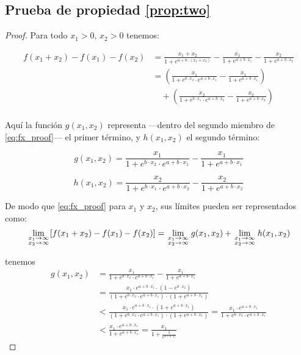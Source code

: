 \subsection{Prueba de propiedad \ref{prop:two}}
\begin{proof}
Para todo $x_1>0$, $x_2>0$ tenemos:

\begin{equation}
\label{eq:fx_proof}
\begin{aligned}
f(x_1+x_2)-f(x_1)-f(x_2)&=\frac{x_1+x_2}{1+e^{a+b\cdot (x_1+x_2)}}-\frac{x_1}{1+e^{a+b\cdot x_1}}-\frac{x_2}{1+e^{a+b\cdot x_2}}\\
&=(\frac{x_1}{1+e^{b\cdot x_2}\cdot e^{a+b\cdot {x_1}}}-\frac{x_1}{1+e^{a+b\cdot x_1}})\\
&\quad +(\frac{x_2}{1+e^{b\cdot x_1}\cdot e^{a+b\cdot {x_2}}}-\frac{x_2}{1+e^{a+b\cdot x_2}})\\
\end{aligned}
\end{equation}

Aquí la función $g(x_1,x_2)$ representa —dentro del segundo miembro de \ref{eq:fx_proof}— el primer término, y $h(x_1,x_2)$ el segundo término:

\begin{equation}
\label{eq:gx_func_proof}
g(x_1,x_2)=\frac{x_1}{1+e^{b\cdot x_2}\cdot e^{a+b\cdot {x_1}}}-\frac{x_1}{1+e^{a+b\cdot x_1}}
\end{equation}

\begin{equation}
\label{eq:hx_func_proof}
h(x_1,x_2)=\frac{x_2}{1+e^{b\cdot x_1}\cdot e^{a+b\cdot {x_2}}}-\frac{x_2}{1+e^{a+b\cdot x_2}}
\end{equation}

De modo que \eqref{eq:fx_proof} para $x_1$ y $x_2$, sus límites pueden ser representados como:
\[
\mathop {\lim }\limits_{\scriptstyle x_1 \to \infty  \hfill \atop  \scriptstyle x_2 \to \infty  \hfill}[f(x_1+x_2)-f(x_1)-f(x_2)]=\mathop {\lim }\limits_{\scriptstyle x_1 \to \infty  \hfill \atop  \scriptstyle x_2 \to \infty  \hfill}g(x_1,x_2)+\mathop {\lim }\limits_{\scriptstyle x_1 \to \infty  \hfill \atop  \scriptstyle x_2 \to \infty  \hfill}h(x_1,x_2)
\]

tenemos
\[
\begin{aligned}
g(x_1,x_2)&=\frac{x_1}{1+e^{b\cdot x_2}\cdot e^{a+b\cdot {x_1}}}-\frac{x_1}{1+e^{a+b\cdot x_1}}\\
&=\frac{x_1\cdot e^{a+b\cdot x_1}\cdot(1-e^{b\cdot x_2})}{(1+e^{b\cdot x_2}\cdot e^{a+b\cdot x_1})\cdot(1+e^{a+b\cdot x_1})}\\
&<\frac{x_1\cdot e^{a+b\cdot x_1}\cdot(1+e^{a+b\cdot x_1})}{(1+e^{b\cdot x_2}\cdot e^{a+b\cdot x_1})\cdot(1+e^{a+b\cdot x_1})}=\frac{x_1\cdot e^{a+b\cdot x_1}}{1+e^{b\cdot x_2}\cdot e^{a+b\cdot x_1}}\\
&<\frac{x_1\cdot e^{a+b\cdot x_1}}{1+e^{a+b\cdot x_1}}=\frac{x_1}{1+\frac{1}{e^{a+b\cdot x_1}}}
\end{aligned}
\]


\end{proof}
